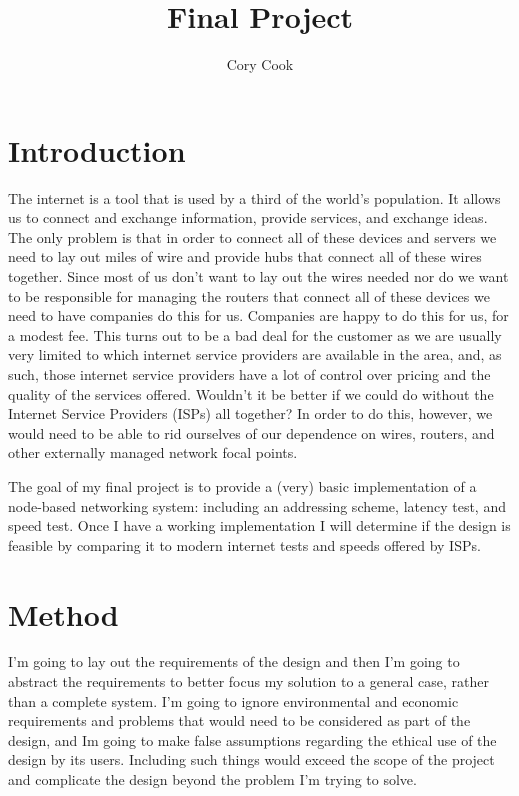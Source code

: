 \documentclass{amsart}
\author{Cory Cook}
\title{Final Project}
\begin{document}
\maketitle
\tableofcontents
\section{Introduction}
The internet is a tool that is used by a third of the world's population. It allows us to connect and exchange information, provide services, and exchange ideas. The only problem is that in order to connect all of these devices and servers we need to lay out miles of wire and provide hubs that connect all of these wires together. Since most of us don't want to lay out the wires needed nor do we want to be responsible for managing the routers that connect all of these devices we need to have companies do this for us. Companies are happy to do this for us, for a modest fee. This turns out to be a bad deal for the customer as we are usually very limited to which internet service providers are available in the area, and, as such, those internet service providers have a lot of control over pricing and the quality of the services offered. Wouldn't it be better if we could do without the Internet Service Providers (ISPs) all together? In order to do this, however, we would need to be able to rid ourselves of our dependence on wires, routers, and other externally managed network focal points.

The goal of my final project is to provide a (very) basic implementation of a node-based networking system: including an addressing scheme, latency test, and speed test. Once I have a working implementation I will determine if the design is feasible by comparing it to modern internet tests and speeds offered by ISPs.
\section{Method}
I'm going to lay out the requirements of the design and then I'm going to abstract the requirements to better focus my solution to a general case, rather than a complete system. I'm going to ignore environmental and economic requirements and problems that would need to be considered as part of the design, and Im going to make false assumptions regarding the ethical use of the design by its users. Including such things would exceed the scope of the project and complicate the design beyond the problem I'm trying to solve.
\end{document}
